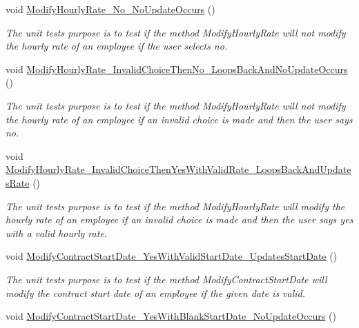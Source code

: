 \begin{DoxyCompactItemize}
void \hyperlink{class_the_company_1_1_tests_1_1_modify_employee_tests_ab8c92173fbd2ce74342103748ebc1e7d}{Modify\+Hourly\+Rate\+\_\+\+No\+\_\+\+No\+Update\+Occurs} ()
\begin{DoxyCompactList}\small\item\em The unit test\textquotesingle{}s purpose is to test if the method Modify\+Hourly\+Rate will not modify the hourly rate of an employee if the user selects no. \end{DoxyCompactList}\item 
void \hyperlink{class_the_company_1_1_tests_1_1_modify_employee_tests_a701e61749c8bb71068c614a1b0643e36}{Modify\+Hourly\+Rate\+\_\+\+Invalid\+Choice\+Then\+No\+\_\+\+Loops\+Back\+And\+No\+Update\+Occurs} ()
\begin{DoxyCompactList}\small\item\em The unit test\textquotesingle{}s purpose is to test if the method Modify\+Hourly\+Rate will not modify the hourly rate of an employee if an invalid choice is made and then the user says no. \end{DoxyCompactList}\item 
void \hyperlink{class_the_company_1_1_tests_1_1_modify_employee_tests_a9bd59a207b0800e0b493d5a12c75e9b8}{Modify\+Hourly\+Rate\+\_\+\+Invalid\+Choice\+Then\+Yes\+With\+Valid\+Rate\+\_\+\+Loops\+Back\+And\+Updates\+Rate} ()
\begin{DoxyCompactList}\small\item\em The unit test\textquotesingle{}s purpose is to test if the method Modify\+Hourly\+Rate will modify the hourly rate of an employee if an invalid choice is made and then the user says yes with a valid hourly rate. \end{DoxyCompactList}\item 
void \hyperlink{class_the_company_1_1_tests_1_1_modify_employee_tests_ae50d9960dd92b9fbb9fde00ca8935dd9}{Modify\+Contract\+Start\+Date\+\_\+\+Yes\+With\+Valid\+Start\+Date\+\_\+\+Updates\+Start\+Date} ()
\begin{DoxyCompactList}\small\item\em The unit test\textquotesingle{}s purpose is to test if the method Modify\+Contract\+Start\+Date will modify the contract start date of an employee if the given date is valid. \end{DoxyCompactList}\item 
void \hyperlink{class_the_company_1_1_tests_1_1_modify_employee_tests_a9539d9047a5fd02fb79a62e1011b947b}{Modify\+Contract\+Start\+Date\+\_\+\+Yes\+With\+Blank\+Start\+Date\+\_\+\+No\+Update\+Occurs} ()

\end{DoxyCompactItemize}
